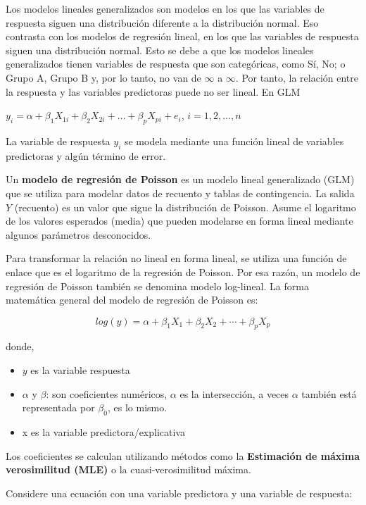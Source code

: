 \documentclass[
]{book}
\begin{document}
Los modelos lineales generalizados son modelos en los que las variables de respuesta siguen una distribución diferente a la distribución normal. Eso contrasta con los modelos de regresión lineal, en los que las variables de respuesta siguen una distribución normal. Esto se debe a que los modelos lineales generalizados tienen variables de respuesta que son categóricas, como Sí, No; o Grupo A, Grupo B y, por lo tanto, no van de \(\infty\) a \(\infty\). Por tanto, la relación entre la respuesta y las variables predictoras puede no ser lineal. En GLM

\(y_i=\alpha+\beta_1X_{1i}+\beta_2X_{2i}+\ldots+\beta_pX_{pi}+e_i\), \vspace{1cm}\(i=1,2,\ldots,n\)

La variable de respuesta \(y_i\) se modela mediante una función lineal de variables predictoras y algún término de error.

Un \textbf{modelo de regresión de Poisson} es un modelo lineal generalizado (GLM) que se utiliza para modelar datos de recuento y tablas de contingencia. La salida \(Y\) (recuento) es un valor que sigue la distribución de Poisson. Asume el logaritmo de los valores esperados (media) que pueden modelarse en forma lineal mediante algunos parámetros desconocidos.

Para transformar la relación no lineal en forma lineal, se utiliza una función de enlace que es el logaritmo de la regresión de Poisson. Por esa razón, un modelo de regresión de Poisson también se denomina modelo log-lineal. La forma matemática general del modelo de regresión de Poisson es:

\[log(y)=\alpha +\beta_1X_1+\beta_2X_2+\cdots+\beta_pX_p\]

donde,

\begin{itemize}
\item
  \(y\) es la variable respuesta
\item
  \(\alpha\) y \(\beta\): son coeficientes numéricos, \(\alpha\) es la intersección, a veces \(\alpha\) también está representada por \(\beta_0\), es lo mismo.
\item
  x es la variable predictora/explicativa
\end{itemize}

Los coeficientes se calculan utilizando métodos como la \textbf{Estimación de máxima verosimilitud (MLE)} o la cuasi-verosimilitud máxima.

Considere una ecuación con una variable predictora y una variable de respuesta:
\end{document}
